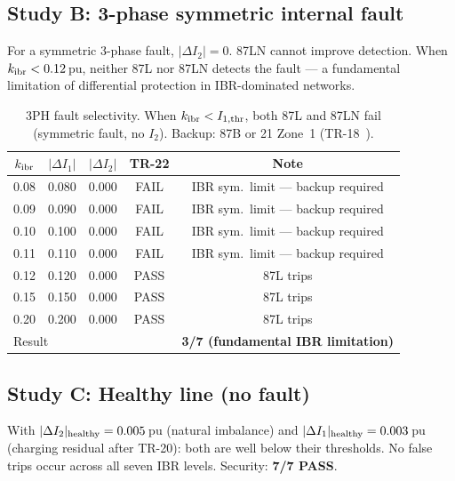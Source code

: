 \documentclass[11pt, a4paper]{article}
\begin{document}
\subsection{Study B: 3-phase symmetric internal fault}

For a symmetric 3-phase fault, $|\Delta I_2| = 0$.  87LN cannot improve
detection.  When $k_{\rm ibr} < 0.12$\,pu, neither 87L nor 87LN detects
the fault — a fundamental limitation of differential protection in
IBR-dominated networks.

\begin{table}[h]
  \centering
  \caption{3PH fault selectivity.  When $k_{\rm ibr} < I_{1,\rm thr}$,
           both 87L and 87LN fail (symmetric fault, no $I_2$).
           Backup: 87B or 21 Zone~1 (TR-18~\cite{SAMBP_TR18}).}
  \label{tab:3ph}
  \begin{tabular}{ccccc}
    \toprule
    $k_{\rm ibr}$ & $|\Delta I_1|$ & $|\Delta I_2|$ & TR-22 & Note \\
    \midrule
    0.08 & 0.080 & 0.000 & FAIL & IBR sym.\ limit — backup required \\
    0.09 & 0.090 & 0.000 & FAIL & IBR sym.\ limit — backup required \\
    0.10 & 0.100 & 0.000 & FAIL & IBR sym.\ limit — backup required \\
    0.11 & 0.110 & 0.000 & FAIL & IBR sym.\ limit — backup required \\
    0.12 & 0.120 & 0.000 & \textcolor{okgreen}{PASS} & 87L trips \\
    0.15 & 0.150 & 0.000 & \textcolor{okgreen}{PASS} & 87L trips \\
    0.20 & 0.200 & 0.000 & \textcolor{okgreen}{PASS} & 87L trips \\
    \midrule
    \multicolumn{4}{l}{Result} & \textbf{3/7 (fundamental IBR limitation)} \\
    \bottomrule
  \end{tabular}
\end{table}

\subsection{Study C: Healthy line (no fault)}

With $|\Delta I_2|_{\rm healthy} = 0.005$\,pu (natural imbalance) and
$|\Delta I_1|_{\rm healthy} = 0.003$\,pu (charging residual after TR-20):
both are well below their thresholds.  No false trips occur across all
seven IBR levels.  Security: \textbf{7/7 PASS}.
\end{document}
